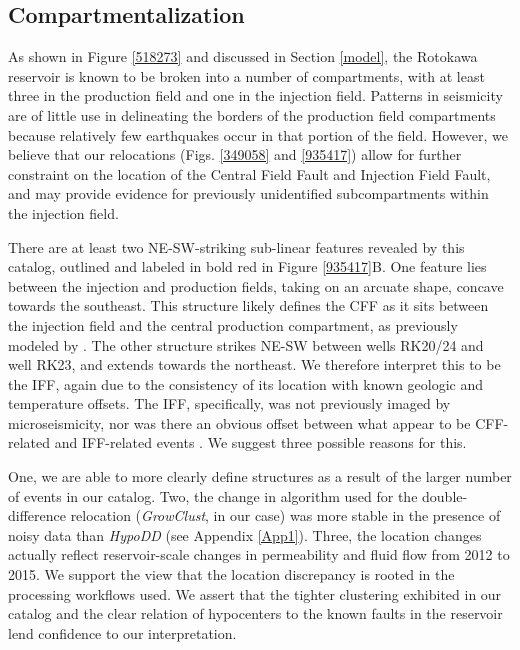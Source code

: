 \subsection{Compartmentalization}
As shown in Figure \ref{518273} and discussed in Section \ref{model}, the Rotokawa reservoir is known to be broken into a number of compartments, with at least three in the production field and one in the injection field. Patterns in seismicity are of little use in delineating the borders of the production field compartments because relatively few earthquakes occur in that portion of the field. However, we believe that our relocations (Figs. \ref{349058} and \ref{935417}) allow for further constraint on the location of the Central Field Fault and Injection Field Fault, and may provide evidence for previously unidentified subcompartments within the injection field.

There are at least two NE-SW-striking sub-linear features revealed by this catalog, outlined and labeled in bold red in Figure \ref{935417}B. One feature lies between the injection and production fields, taking on an arcuate shape, concave towards the southeast. This structure likely defines the CFF as it sits between the injection field and the central production compartment, as previously modeled by \citet{wallis2013}. The other structure strikes NE-SW between wells RK20/24 and well RK23, and extends towards the northeast. We therefore interpret this to be the IFF, again due to the consistency of its location with known geologic and temperature offsets. The IFF, specifically, was not previously imaged by microseismicity, nor was there an obvious offset between what appear to be CFF-related and IFF-related events \citep{Sherburn_2015}. We suggest three possible reasons for this.

One, we are able to more clearly define structures as a result of the larger number of events in our catalog. Two, the change in algorithm used for the double-difference relocation (\textit{GrowClust}, in our case) was more stable in the presence of noisy data than \textit{HypoDD} (see Appendix \ref{App1}). Three, the location changes actually reflect reservoir-scale changes in permeability and fluid flow from 2012 to 2015. We support the view that the location discrepancy is rooted in the processing workflows used. We assert that the tighter clustering exhibited in our catalog and the clear relation of hypocenters to the known faults in the reservoir lend confidence to our interpretation.

